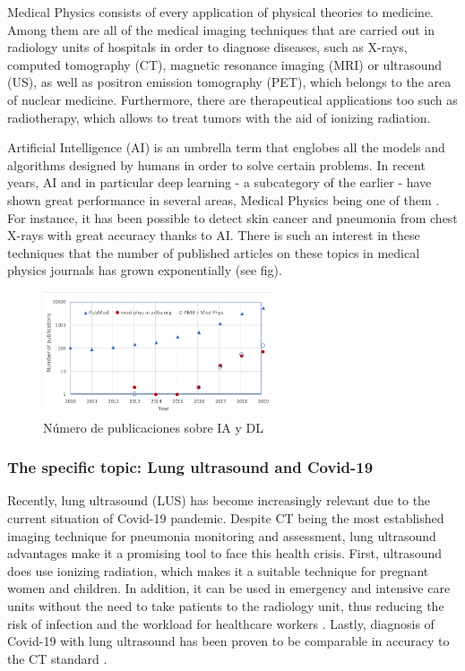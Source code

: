 \documentclass[11pt]{article} %
\begin{document}
	Medical Physics consists of every application of physical theories to medicine. Among them are all of the medical imaging techniques that are carried out in radiology units of hospitals in order to diagnose diseases, such as X-rays, computed tomography (CT), magnetic resonance imaging (MRI) or ultrasound (US), as well as positron emission tomography (PET), which belongs to the area of nuclear medicine. Furthermore, there are therapeutical applications too such as radiotherapy, which allows to treat tumors with the aid of ionizing radiation.
	
	Artificial Intelligence (AI) is an umbrella term that englobes all the models and algorithms designed by humans in order to solve certain problems. In recent years, AI and in particular deep learning - a subcategory of the earlier - have shown great performance in several areas, Medical Physics being one of them \cite{shen}. For instance, it has been possible to detect skin cancer \cite{esteva} and pneumonia from chest X-rays \cite{rajpurkar} with great accuracy thanks to AI. There is such an interest in these techniques that the number of published articles on these topics in medical physics journals has grown exponentially (see fig).
	
	
	\begin{figure}[h]
	\centering
	\includegraphics[width=0.6\textwidth]{figuras/DL_papers.png}	
	\caption{Número de publicaciones sobre IA y DL \cite{shen}}	
	\end{figure}
	
\subsubsection{The specific topic: Lung ultrasound and Covid-19}
	Recently, lung ultrasound (LUS) has become increasingly relevant due to the current situation of Covid-19 pandemic. Despite CT being the most established imaging technique for pneumonia monitoring and assessment, lung ultrasound advantages make it a promising tool to face this health crisis. First, ultrasound does use ionizing radiation, which makes it a suitable technique for pregnant women and children. In addition, it can be used in emergency and intensive care units without the need to take patients to the radiology unit, thus reducing the risk of infection and the workload for healthcare workers \cite{allinovi}. Lastly, diagnosis of Covid-19 with lung ultrasound has been proven to be comparable in accuracy to the CT standard \cite{ottaviani}.
	
\end{document}
